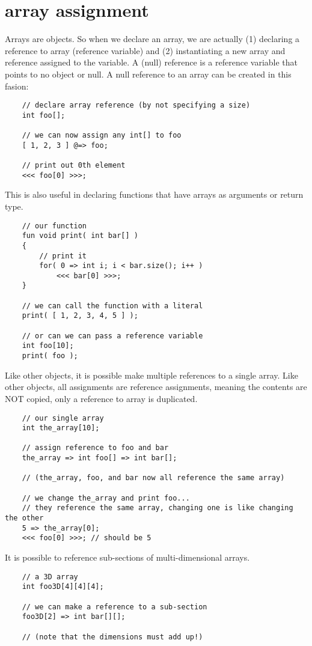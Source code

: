 \section{array assignment}

Arrays are objects. So when we declare an array, we are actually (1) declaring a reference to array (reference variable) and (2) instantiating a new array and reference assigned to the variable. A (null) reference is a reference variable that points to no
 object or null. A null reference to an array can be created in this fasion:
\begin{verbatim}
    // declare array reference (by not specifying a size)
    int foo[];

    // we can now assign any int[] to foo
    [ 1, 2, 3 ] @=> foo;

    // print out 0th element
    <<< foo[0] >>>;
\end{verbatim}

This is also useful in declaring functions that have arrays as arguments or return type.
\begin{verbatim}
    // our function
    fun void print( int bar[] )
    {
        // print it
        for( 0 => int i; i < bar.size(); i++ )
            <<< bar[0] >>>;
    }

    // we can call the function with a literal
    print( [ 1, 2, 3, 4, 5 ] );

    // or can we can pass a reference variable
    int foo[10];
    print( foo );
\end{verbatim}

Like other objects, it is possible make multiple references to a single array. Like other objects, all assignments are reference assignments, meaning the contents are NOT copied, only a reference to array is duplicated.
\begin{verbatim}
    // our single array
    int the_array[10];

    // assign reference to foo and bar
    the_array => int foo[] => int bar[];

    // (the_array, foo, and bar now all reference the same array)

    // we change the_array and print foo...
    // they reference the same array, changing one is like changing the other
    5 => the_array[0];
    <<< foo[0] >>>; // should be 5
\end{verbatim}

It is possible to reference sub-sections of multi-dimensional arrays.
\begin{verbatim}
    // a 3D array
    int foo3D[4][4][4];

    // we can make a reference to a sub-section
    foo3D[2] => int bar[][];

    // (note that the dimensions must add up!)
\end{verbatim}
